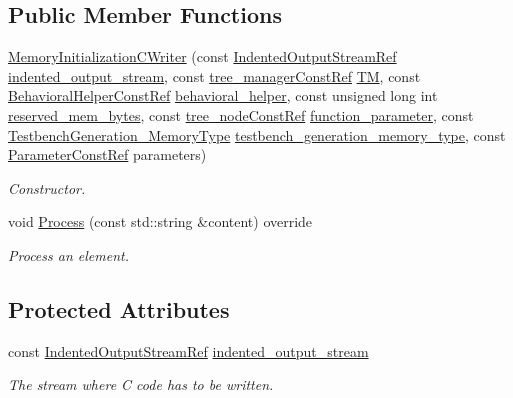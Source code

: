 \subsection*{Public Member Functions}
\begin{DoxyCompactItemize}
\item 
\hyperlink{classMemoryInitializationCWriter_a2617a7678c80a2b33a0ecc97f3f509fd}{Memory\+Initialization\+C\+Writer} (const \hyperlink{indented__output__stream_8hpp_ab32278e11151ef292759c88e99b77feb}{Indented\+Output\+Stream\+Ref} \hyperlink{classMemoryInitializationCWriter_a3c706735fead6b0299e9d4b9dcb7d983}{indented\+\_\+output\+\_\+stream}, const \hyperlink{tree__manager_8hpp_a792e3f1f892d7d997a8d8a4a12e39346}{tree\+\_\+manager\+Const\+Ref} \hyperlink{classMemoryInitializationWriterBase_ad7639a9140b8d5c42c2c0c4255ad4cbf}{TM}, const \hyperlink{behavioral__helper_8hpp_aae973b54cac87eef3b27442aa3e1e425}{Behavioral\+Helper\+Const\+Ref} \hyperlink{classMemoryInitializationWriterBase_ae5f60dc91641447c00b023836743b6b3}{behavioral\+\_\+helper}, const unsigned long int \hyperlink{classMemoryInitializationWriterBase_ac424618ba0c88d441a905b6cbf891b65}{reserved\+\_\+mem\+\_\+bytes}, const \hyperlink{tree__node_8hpp_a3cf5d02292c940f3892425a5b5fdec3c}{tree\+\_\+node\+Const\+Ref} \hyperlink{classMemoryInitializationWriterBase_a2bdd8c25a0b756f6290cb48a6b9d0303}{function\+\_\+parameter}, const \hyperlink{testbench__generation_8hpp_ad84688161fffbe7da2fc2b9a39b93198}{Testbench\+Generation\+\_\+\+Memory\+Type} \hyperlink{classMemoryInitializationWriterBase_ac4f718dfd59eddbc0adf75e98b227ccb}{testbench\+\_\+generation\+\_\+memory\+\_\+type}, const \hyperlink{Parameter_8hpp_a37841774a6fcb479b597fdf8955eb4ea}{Parameter\+Const\+Ref} parameters)
\begin{DoxyCompactList}\small\item\em Constructor. \end{DoxyCompactList}\item 
void \hyperlink{classMemoryInitializationCWriter_a9f35397c3df92849e7f235b5da9c7bb0}{Process} (const std\+::string \&content) override
\begin{DoxyCompactList}\small\item\em Process an element. \end{DoxyCompactList}\end{DoxyCompactItemize}
\subsection*{Protected Attributes}
\begin{DoxyCompactItemize}
\item 
const \hyperlink{indented__output__stream_8hpp_ab32278e11151ef292759c88e99b77feb}{Indented\+Output\+Stream\+Ref} \hyperlink{classMemoryInitializationCWriter_a3c706735fead6b0299e9d4b9dcb7d983}{indented\+\_\+output\+\_\+stream}
\begin{DoxyCompactList}\small\item\em The stream where C code has to be written. \end{DoxyCompactList}\end{DoxyCompactItemize}
